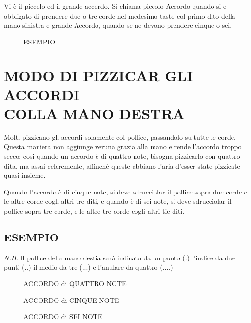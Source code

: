 \documentclass[a4paper]{book}
\begin{document}
Vi è il piccolo ed il grande accordo.  Si chiama piccolo Accordo quando si e obbligato di prendere due o tre corde nel medesimo tasto col primo dito della mano sinistra e grande Accordo, quando se ne devono prendere cinque o sei.

{
  \setlength{\intextsep}{0pt}
  \begin{figure}[h]
    \centering
    \caption{ESEMPIO}
    \label{fig:barre}
  \end{figure}
}

\chapter[Il modi di pizzicar gli accordi]{%
  MODO DI PIZZICAR GLI ACCORDI\\[-1ex]
  \small COLLA MANO DESTRA}

Molti pizzicano gli accordi solamente col pollice, passandolo su tutte le corde.  Questa maniera non aggiunge veruna grazia alla mano e rende l'accordo troppo secco; cosi quando un accordo è di quattro note, bisogna pizzicarlo con quattro dita, ma assai celeremente, affinchè queste abbiano l'aria d'esser state pizzicate quasi insieme.

Quando l'accordo è di cinque note, si deve sdrucciolar il pollice sopra due corde e le altre corde cogli altri tre diti, e quando è di sei note, si deve sdrucciolar il pollice sopra tre corde, e le altre tre corde cogli altri tie diti.

\section*{ESEMPIO}

\textit{N.B\@.}  Il pollice della mano destia sarà indicato da un punto (.) l'indice da due punti (..) il medio da tre (...) e l'anulare da quattro (....)

{
  \setlength{\abovecaptionskip}{7pt}
  \begin{figure}[H]
    \centering
    \begin{minipage}{2.4in}
      \caption{ACCORDO di QUATTRO NOTE}
    \end{minipage}
    \hfill
    \begin{minipage}{3in}
      \caption{ACCORDO di CINQUE NOTE}
    \end{minipage}
  \end{figure}
  \begin{figure}[H]
    \centering
    \begin{minipage}{3.6in}
    \caption{ACCORDO di SEI NOTE}
  \end{minipage}
  \end{figure}
}
\end{document}
